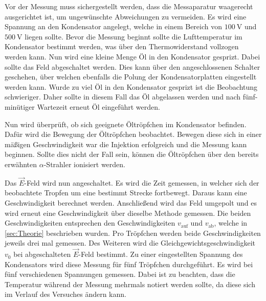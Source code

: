 Vor der Messung muss sichergestellt werden, dass die Messaparatur waagerecht ausgerichtet ist, um ungewünschte Abweichungen zu vermeiden. Es 
wird eine Spannung an den Kondensator angelegt, welche in einem Bereich von $\qty{100}{\volt}$ und $\qty{500}{\volt}$ liegen sollte. Bevor die Messung beginnt sollte die 
Lufttemperatur im Kondensator bestimmt werden, was über den Thermowiderstand vollzogen werden kann. Nun wird eine kleine Menge Öl in den Kondensator gesprizt. 
Dabei sollte das Feld abgeschaltet werden. Dies kann über den 
angeschlossenen Schalter geschehen, über welchen ebenfalls die Polung der Kondensatorplatten eingestellt werden kann. Wurde zu viel Öl in den Kondensator gesprizt ist die Beobachtung 
schwieriger. Daher sollte in diesem Fall das Öl abgelassen werden und nach fünf-minütiger Wartezeit erneut Öl eingeführt werden. 

Nun wird überprüft, ob sich geeignete Öltröpfchen im Kondensator befinden. Dafür wird die Bewegung der Öltröpfchen beobachtet. Bewegen diese sich in einer mäßigen 
Geschwindigkeit war die Injektion erfolgreich und die Messung kann beginnen. Sollte dies nicht der Fall sein, können die Öltröpfchen über den bereits erwähnten 
$\alpha$-Strahler ionisiert werden.

Das $\vec{E}$-Feld wird nun angeschaltet. Es wird die Zeit gemessen, in welcher sich der beobachtete Tropfen um eine bestimmt Strecke fortbewegt. Daraus kann eine Geschwindigkeit
berechnet werden. Anschließend wird das Feld umgepolt und es wird erneut eine Geschwindigkeit über dieselbe Methode gemessen. Die beiden Geschwindigkeiten entsprechen den 
Geschwindigkeiten $v_\text{auf}$ und $v_\text{ab}$, welche in \autoref{sec:Theorie} beschrieben wurden. 
Pro Tröpfchen werden beide Geschwindigkeiten jeweils drei mal gemessen. Des Weiteren wird die Gleichgewichtsgeschwindigkeit $v_0$ bei abgeschalteten 
$\vec{E}$-Feld bestimmt. Zu einer eingestellten Spannung des Kondensators wird diese Messung für fünf Tröpfchen durchgeführt. 
Es wird bei fünf verschiedenen Spannungen gemessen. Dabei ist zu beachten, dass die Temperatur während der Messung mehrmals notiert werden sollte, da diese sich im Verlauf
des Versuches ändern kann.
